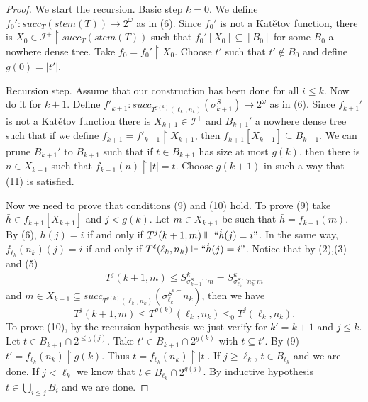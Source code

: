 \documentclass[10pt,a4paper]{amsart}
\newcommand{\id}{\mathcal{I}}
\begin{document}
\begin{proof}

We start the recursion. Basic step $k=0$. We define $f_0':succ_T(stem(T))\rightarrow2^\omega$ as in (6).
Since $f_0'$ is not a Kat\v{e}tov function, there is $X_0\in \id^+\upharpoonright succ_T(stem(T))$ such that $f_0'[X_0]\subseteq [B_0]$ for some $B_0$ a nowhere dense tree. Take $f_0=f_0'\upharpoonright X_0$. Choose $t'$ such that $t'\not \in B_0$ and define $g(0)=|t'|$.

Recursion step. Assume that our construction has been done for all $i\leq k$. Now do it for $k+1$. Define $f'_{k+1}:succ_{T^{g(k)}(\ell_k,n_k)}(\sigma^S_{k+1}) \rightarrow2^\omega$ as in (6). Since $f_{k+1}'$ is not a Kat\v{e}tov function there is $X_{k+1}\in \id^+$ and $B_{k+1}'$ a nowhere dense tree such that if we define $f_{k+1}=f'_{k+1}\upharpoonright X_{k+1}$, then $f_{k+1}[X_{k+1}]\subseteq B_{k+1}$. We can prune $B_{k+1}'$ to $B_{k+1}$ such that if $t\in B_{k+1}$ has size at most $g(k)$, then there is $n\in X_{k+1}$ such that $f_{k+1}(n)\upharpoonright |t|= t$. Choose $g(k+1)$ in such a way that (11) is satisfied.

Now we need to prove that conditions (9) and (10) hold. To prove (9) take $\bar h\in f_{k+1}[X_{k+1}]$ and $j<g(k)$. Let $m\in X_{k+1}$ be such that $\bar h=f_{k+1}(m)$. By (6), $\bar h(j)=i$ if and only if $T^j(k+1,m)\Vdash``\dot h(j)=i"$. In the same way, $f_{\ell_k}(n_k)(j)=i$ if and only if $T^\ell(\ell_k,n_k)\Vdash``\dot h(j)=i"$.
Notice that by (2),(3) and (5)
\[T^j(k+1,m)\leq S^{k}_{{\sigma^S_{k+1}}^\frown m}=S^{k}_{{\sigma^S_{\ell_k}}^\frown n_k^\frown m}
\]
and  $m\in X_{k+1}\subseteq succ_{T^{g(k)}(\ell_k,n_k)}({\sigma^{S^k}_{\ell_k}}^\frown n_k)$, then we have 
\begin{displaymath}
    T^j(k+1,m)\leq T^{g(k)}(\ell_k,n_k)\leq_0 T^j(\ell_k,n_k).
\end{displaymath}
To prove (10), by the recursion hypothesis we just verify for $k'=k+1$ and $j\leq k$. Let $t\in B_{k+1}\cap2^{\leq g(j)}$. Take $t'\in B_{k+1}\cap2^{g(k)}$ with $t \subseteq t'$. By (9) $t'=f_{\ell_k}(n_k)\upharpoonright g(k)$. Thus $t=f_{\ell_k}(n_k)\upharpoonright |t|$. If $j\geq \ell_k$, $t\in B_{\ell_k}$ and we are done. If $j<\ell_k$ we know that $t\in B_{\ell_k}\cap 2^{g(j)}$. By inductive hypothesis $t\in \bigcup_{i\leq j} B_i$ and we are done.




\end{proof}
\end{document}
